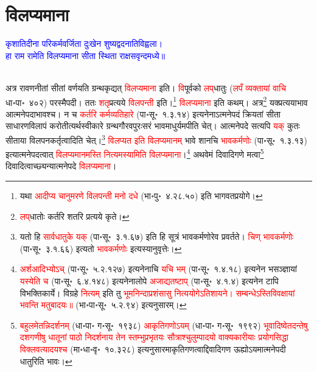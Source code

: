 \section[विलप्यमाना]{विलप्यमाना}
\centering\textcolor{blue}{कृशातिदीना परिकर्मवर्जिता दुःखेन शुष्यद्वदनातिविह्वला।\nopagebreak\\
हा राम रामेति विलप्यमाना सीता स्थिता राक्षसवृन्दमध्ये॥}\nopagebreak\\
\\
\begin{sloppypar}\justifying\noindent\hspace{10mm} अत्र रावण\-नीतां सीतां वर्णयति ग्रन्थकृद्यत् \textcolor{red}{विलप्यमाना} इति। \textcolor{red}{वि}\-पूर्वको \textcolor{red}{लप्‌}\-धातुः (\textcolor{red}{लपँ व्यक्तायां वाचि} धा॰पा॰~४०२) परस्मैपदी। ततः \textcolor{red}{शतृ}\-प्रत्यये \textcolor{red}{विलपन्ती} इति।\footnote{यथा \textcolor{red}{आदीप्य चानुमरणे विलपन्ती मनो दधे} (भा॰पु॰~४.२८.५०) इति भागवत\-प्रयोगे।} \textcolor{red}{विलप्यमाना} इति कथम्। अत्र\footnote{\textcolor{red}{लप्‌}\-धातोः कर्तरि शतरि प्रत्यये कृते।} यक्प्रत्ययाभाव आत्मनेपदाभावश्च। न च \textcolor{red}{कर्तरि कर्म\-व्यतिहारे} (पा॰सू॰~१.३.१४) इत्यनेनाऽत्मनेपदं क्रियतां सीता साधारण\-विलापं करोतीत्यर्थ\-स्वीकारे ग्रन्थ\-गौरव\-पुरः\-सरं भाव\-माधुर्यमपीति चेत्। आत्मनेपदे सत्यपि \textcolor{red}{यक्} कुतः सीताया विलपन\-कर्तृत्वादिति चेत्।\footnote{यतो हि \textcolor{red}{सार्वधातुके यक्} (पा॰सू॰~३.१.६७) इति हि सूत्रं भावकर्मणोरेव प्रवर्तते। \textcolor{red}{चिण् भावकर्मणोः} (पा॰सू॰~३.१.६६) इत्यतो \textcolor{red}{भावकर्मणोः} इत्यस्यानुवृत्तेः।} \textcolor{red}{विलप्यत इति विलप्यमानम्} भावे शानचि \textcolor{red}{भाव\-कर्मणोः} (पा॰सू॰~१.३.१३) इत्यात्मने\-पदत्वात् \textcolor{red}{विलप्यमानमस्ति नित्यमस्यामिति विलप्यमाना}।\footnote{\textcolor{red}{अर्शआदिभ्योऽच्} (पा॰सू॰~५.२.१२७) इत्यनेनाचि \textcolor{red}{यचि भम्} (पा॰सू॰~१.४.१८) इत्यनेन भसञ्ज्ञायां \textcolor{red}{यस्येति च} (पा॰सू॰~६.४.१४८) इत्यनेनालोपे \textcolor{red}{अजाद्यतष्टाप्‌} (पा॰सू॰~४.१.४) इत्यनेन टापि विभक्ति\-कार्ये। विग्रहे \textcolor{red}{नित्यम्} इति तु \textcolor{red}{भूम\-निन्दा\-प्रशंसासु नित्ययोगेऽति\-शायने। सम्बन्धेऽस्ति\-विवक्षायां भवन्ति मतुबादयः॥} (भा॰पा॰सू॰~५.२.९४) इत्यनुसारम्।} अथवेमं दिवादिगणे मत्वा\footnote{\textcolor{red}{बहुलमेतन्निदर्शनम्} (धा॰पा॰ ग॰सू॰~१९३८) \textcolor{red}{आकृतिगणोऽयम्} (धा॰पा॰ ग॰सू॰~१९९२) \textcolor{red}{भूवादिष्वेतदन्तेषु दशगणीषु धातूनां पाठो निदर्शनाय तेन स्तम्भुप्रभृतयः सौत्राश्चुलुम्पादयो वाक्यकारीयाः प्रयोगसिद्धा विक्लवत्यादयश्च} (मा॰धा॰वृ॰~१०.३२८) इत्यनुसारमाकृति\-गणत्वाद्दिवादि\-गण ऊह्योऽयमात्मने\-पदी धातुरिति भावः।} दिवादित्वाच्छ्यन्यात्मनेपदे \textcolor{red}{विलप्यमाना}।\end{sloppypar}
